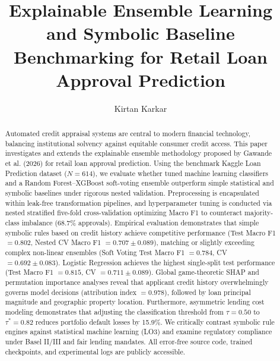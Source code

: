 \documentclass{COMPXXXX}
\begin{document}
\title{Explainable Ensemble Learning and Symbolic Baseline Benchmarking for Retail Loan Approval Prediction}

\author{Kirtan Karkar}

\maketitle


\begin{abstract}
Automated credit appraisal systems are central to modern financial technology, balancing institutional solvency against equitable consumer credit access. This paper investigates and extends the explainable ensemble methodology proposed by Gawande et al. (2026) for retail loan approval prediction. Using the benchmark Kaggle Loan Prediction dataset ($N=614$), we evaluate whether tuned machine learning classifiers and a Random Forest--XGBoost soft-voting ensemble outperform simple statistical and symbolic baselines under rigorous nested validation. Preprocessing is encapsulated within leak-free transformation pipelines, and hyperparameter tuning is conducted via nested stratified five-fold cross-validation optimizing Macro F1 to counteract majority-class imbalance (68.7\% approvals). Empirical evaluation demonstrates that simple symbolic rules based on credit history achieve competitive performance (Test Macro F1 $= 0.802$, Nested CV Macro F1 $= 0.707 \pm 0.089$), matching or slightly exceeding complex non-linear ensembles (Soft Voting Test Macro F1 $= 0.784$, CV $= 0.692 \pm 0.083$). Logistic Regression achieves the highest single-split test performance (Test Macro F1 $= 0.815$, CV $= 0.711 \pm 0.089$). Global game-theoretic SHAP and permutation importance analyses reveal that applicant credit history overwhelmingly governs model decisions (attribution index $= 0.978$), followed by loan principal magnitude and geographic property location. Furthermore, asymmetric lending cost modeling demonstrates that adjusting the classification threshold from $\tau=0.50$ to $\tau^*=0.82$ reduces portfolio default losses by 15.9\%. We critically contrast symbolic rule engines against statistical machine learning (LO3) and examine regulatory compliance under Basel II/III and fair lending mandates. All error-free source code, trained checkpoints, and experimental logs are publicly accessible.
\end{abstract}
\end{document}
